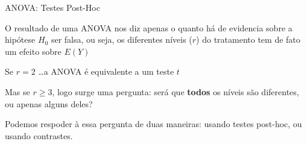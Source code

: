 \documentclass{beamer}\usepackage[]{graphicx}\usepackage[]{color}
\begin{document}
% 
% 
% 
% 
% 
% 
% 
% 
% 
% 
% 

\begin{frame}{ANOVA: Testes Post-Hoc}

O resultado de uma ANOVA nos diz apenas o quanto há de evidencia sobre a hipótese $H_0$ ser falsa, ou seja, os diferentes níveis ($r$) do tratamento tem de fato um efeito sobre $E(Y)$ \pause
\vfill

Se $r = 2$ \ldots a ANOVA é equivalente a um teste $t$
\vfill

Mas se $r \geq 3$, logo surge uma pergunta: será que \textbf{todos} os níveis são diferentes, ou apenas alguns deles?
\vfill

Podemos respoder à essa pergunta de duas maneiras: usando testes post-hoc, ou usando contrastes.

\end{frame}
\end{document}
